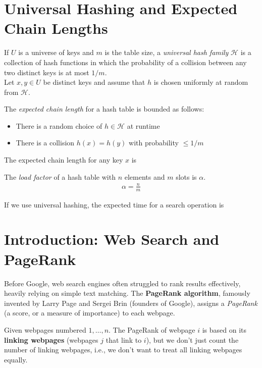 \documentclass[11pt]{exam}
\begin{document}
	\section{Universal Hashing and Expected Chain Lengths}
	If $U$ is a universe of keys and $m$ is the table size, a \emph{universal hash family} $\mathcal{H}$ is a collection of hash functions in which the probability of a collision between any two distinct keys is at most $1/m$. \\
	
	Let $x, y \in U$ be distinct keys and assume that $h$ is chosen uniformly at random from $\mathcal{H}$. 
	
	The \emph{expected chain length} for a hash table is bounded as follows:
	\begin{itemize}
		\item There is a random choice of $h \in \mathcal{H}$ at runtime
		\item There is a collision $h(x) = h(y)$ with probability $\le 1/m$
	\end{itemize}
	\begin{lemma}
		The expected chain length for any key $x$ is 
	\end{lemma}
	
	\vs{5cm}
	
	The \emph{load factor} of a hash table with $n$ elements and $m$ slots is $\alpha$.
	\begin{align*}
		\alpha = \frac{n}{m}
	\end{align*}
	
	\begin{lemma}
		If we use universal hashing, the expected time for a search operation is \hide{$\Theta(1 + \alpha)$ }
	\end{lemma}
	
	\newpage

\section{Introduction: Web Search and PageRank}
Before Google, web search engines often struggled to rank results effectively, heavily relying on simple text matching. The \textbf{PageRank algorithm}, famously invented by Larry Page and Sergei Brin (founders of Google), assigns a \emph{PageRank} (a score, or a measure of importance) to each webpage.

Given webpages numbered $1, \ldots, n$. The PageRank of webpage $i$ is based on its \textbf{linking webpages} (webpages $j$ that link to $i$), but we don't just count the number of linking webpages, i.e., we don't want to treat all linking webpages equally.
\end{document}

